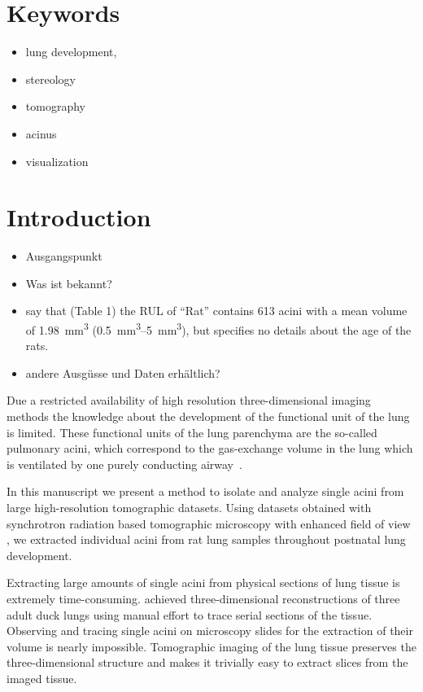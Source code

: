 \documentclass[%
	draft,
	paper=a4,%
	abstract=true,%
	]{scrartcl}
\begin{document}
\section{Keywords}
\begin{itemize}
	\item lung development,
	\item stereology
	\item tomography
	\item acinus
	\item visualization
\end{itemize}
\clearpage
\listoftodos
\clearpage
{}
\tableofcontents

\clearpage
\section{Introduction}
\begin{itemize}
	\item Ausgangspunkt
	\item Was ist bekannt?
	\item \citet{Rodriguez1987} say that (Table 1) the RUL of “Rat” contains 613 acini with a mean volume of \SI{1.98}{\milli\meter\cubed} (\SIrange{0.5}{5}{\milli\meter\cubed}), but specifies no details about the age of the rats.
	\item andere Ausgüsse und Daten erhältlich?
\end{itemize}

Due a restricted availability of high resolution three-dimensional imaging methods the knowledge about the development of the functional unit of the lung is limited. These functional units of the lung parenchyma are the so-called pulmonary acini, which correspond to the gas-exchange volume in the lung which is ventilated by one purely conducting airway~\cite{Rodriguez1987}.

In this manuscript we present a method to isolate and analyze single acini from large high-resolution tomographic datasets. Using datasets obtained with synchrotron radiation based tomographic microscopy with enhanced field of view \cite{Haberthuer2010a}, we extracted individual acini from rat lung samples throughout postnatal lung development. 

Extracting large amounts of single acini from physical sections of lung tissue is extremely time-consuming. \citet{Woodward2005} achieved three-dimensional reconstructions of three adult duck lungs using manual effort to trace serial sections of the tissue. Observing and tracing single acini on microscopy slides for the extraction of their volume is nearly impossible. Tomographic imaging of the lung tissue preserves the three-dimensional structure and makes it trivially easy to extract slices from the imaged tissue.
\end{document}
